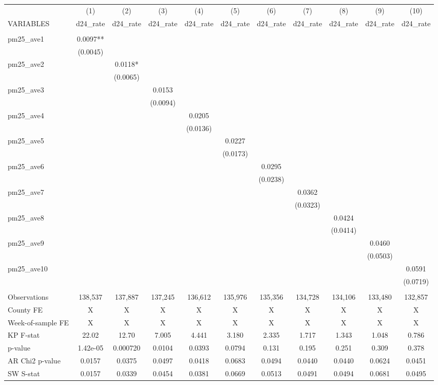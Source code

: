 \begin{tabular}{lcccccccccc} \hline
 & (1) & (2) & (3) & (4) & (5) & (6) & (7) & (8) & (9) & (10) \\
VARIABLES & d24\_rate & d24\_rate & d24\_rate & d24\_rate & d24\_rate & d24\_rate & d24\_rate & d24\_rate & d24\_rate & d24\_rate \\ \hline
 &  &  &  &  &  &  &  &  &  &  \\
pm25\_ave1 & 0.0097** &  &  &  &  &  &  &  &  &  \\
 & (0.0045) &  &  &  &  &  &  &  &  &  \\
pm25\_ave2 &  & 0.0118* &  &  &  &  &  &  &  &  \\
 &  & (0.0065) &  &  &  &  &  &  &  &  \\
pm25\_ave3 &  &  & 0.0153 &  &  &  &  &  &  &  \\
 &  &  & (0.0094) &  &  &  &  &  &  &  \\
pm25\_ave4 &  &  &  & 0.0205 &  &  &  &  &  &  \\
 &  &  &  & (0.0136) &  &  &  &  &  &  \\
pm25\_ave5 &  &  &  &  & 0.0227 &  &  &  &  &  \\
 &  &  &  &  & (0.0173) &  &  &  &  &  \\
pm25\_ave6 &  &  &  &  &  & 0.0295 &  &  &  &  \\
 &  &  &  &  &  & (0.0238) &  &  &  &  \\
pm25\_ave7 &  &  &  &  &  &  & 0.0362 &  &  &  \\
 &  &  &  &  &  &  & (0.0323) &  &  &  \\
pm25\_ave8 &  &  &  &  &  &  &  & 0.0424 &  &  \\
 &  &  &  &  &  &  &  & (0.0414) &  &  \\
pm25\_ave9 &  &  &  &  &  &  &  &  & 0.0460 &  \\
 &  &  &  &  &  &  &  &  & (0.0503) &  \\
pm25\_ave10 &  &  &  &  &  &  &  &  &  & 0.0591 \\
 &  &  &  &  &  &  &  &  &  & (0.0719) \\
 &  &  &  &  &  &  &  &  &  &  \\
Observations & 138,537 & 137,887 & 137,245 & 136,612 & 135,976 & 135,356 & 134,728 & 134,106 & 133,480 & 132,857 \\
County FE & X & X & X & X & X & X & X & X & X & X \\
Week-of-sample FE & X & X & X & X & X & X & X & X & X & X \\
KP F-stat & 22.02 & 12.70 & 7.005 & 4.441 & 3.180 & 2.335 & 1.717 & 1.343 & 1.048 & 0.786 \\
p-value & 1.42e-05 & 0.000720 & 0.0104 & 0.0393 & 0.0794 & 0.131 & 0.195 & 0.251 & 0.309 & 0.378 \\
AR Chi2 p-value & 0.0157 & 0.0375 & 0.0497 & 0.0418 & 0.0683 & 0.0494 & 0.0440 & 0.0440 & 0.0624 & 0.0451 \\
 SW S-stat & 0.0157 & 0.0339 & 0.0454 & 0.0381 & 0.0669 & 0.0513 & 0.0491 & 0.0494 & 0.0681 & 0.0495 \\ \hline
\end{tabular}
